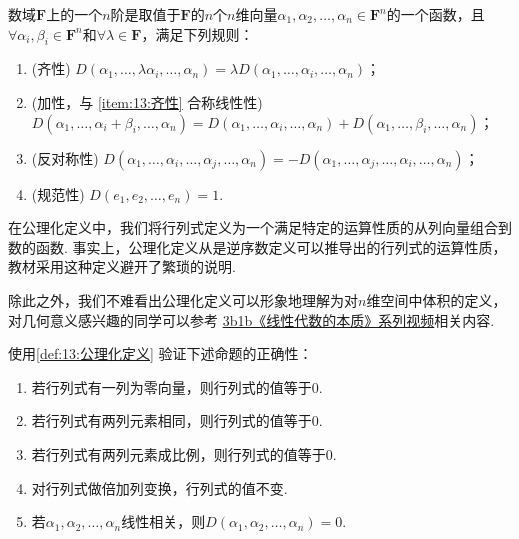 \begin{definition}[行列式] \label{def:13:公理化定义} 
    数域$\mathbf{F}$上的一个$n$阶是取值于$\mathbf{F}$的$n$个$n$维向量$\alpha_1,\alpha_2,\ldots,\alpha_n \in \mathbf{F}^n$的一个函数，且$\forall \alpha_i,\beta_i \in \mathbf{F}^n$和$\forall \lambda \in \mathbf{F}$，满足下列规则：
    \begin{enumerate}
        \item \label{item:13:齐性}
              (齐性) $D(\alpha_1,\ldots,\lambda\alpha_i,\ldots,\alpha_n)=\lambda D(\alpha_1,\ldots,\alpha_i,\ldots,\alpha_n)$；

        \item \label{item:13:加性}
              (加性，与 \ref*{item:13:齐性} 合称线性性) \\
              $D(\alpha_1,\ldots,\alpha_i+\beta_i,\ldots,\alpha_n)=D(\alpha_1,\ldots,\alpha_i,\ldots,\alpha_n)+D(\alpha_1,\ldots,\beta_i,\ldots,\alpha_n)$；

        \item \label{item:13:反对称性}
              (反对称性) $D(\alpha_1,\ldots,\alpha_i,\ldots,\alpha_j,\ldots,\alpha_n)=-D(\alpha_1,\ldots,\alpha_j,\ldots,\alpha_i,\ldots,\alpha_n)$；

        \item \label{item:13:规范性}
              (规范性) $D(e_1,e_2,\ldots,e_n)=1$.
    \end{enumerate}
\end{definition}
在公理化定义中，我们将行列式定义为一个满足特定的运算性质的从列向量组合到数的函数. 事实上，公理化定义从是逆序数定义可以推导出的行列式的运算性质，教材采用这种定义避开了繁琐的说明.

除此之外，我们不难看出公理化定义可以形象地理解为对$n$维空间中体积的定义，对几何意义感兴趣的同学可以参考 \href{https://b23.tv/BV1ys411472E}{3b1b《线性代数的本质》系列视频}相关内容.
\begin{example} \label{ex:13:公理化定义}
    使用\autoref{def:13:公理化定义} 验证下述命题的正确性：
    \begin{enumerate}
        \item 若行列式有一列为零向量，则行列式的值等于0.

        \item 若行列式有两列元素相同，则行列式的值等于0.

        \item 若行列式有两列元素成比例，则行列式的值等于0.

        \item 对行列式做倍加列变换，行列式的值不变.

        \item 若$\alpha_1,\alpha_2,\ldots,\alpha_n$线性相关，则$D(\alpha_1,\alpha_2,\ldots,\alpha_n)=0$.
    \end{enumerate}
\end{example}


